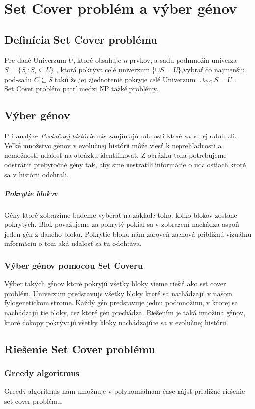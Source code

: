 \chapter{Set Cover problém a výber génov}
\section{Definícia Set Cover problému}
Pre dané Univerzum $U$, ktoré obsahuje $n$ prvkov, a sadu podmnožín univerza \(S=\{ S_i : S_i \subseteq U \}\)
, ktorá pokrýva celé univerzum \(\{\cup S = U\}\),vybrať čo najmenšiu pod-sadu \(C \subseteq S\) takú že jej zjednotenie pokryje celé Univerzum 
\(\cup_{S \epsilon C} S = U \) .\\ Set Cover problém patrí medzi NP tažké problémy.
\section{Výber génov}
Pri analýze \emph{Evolučnej histórie} nás zaujímajú udalosti ktoré sa v nej odohrali. Veľké množstvo génov v evolučnej histórii môže viesť k neprehľadnosti a nemožnosti udalosť na obrázku identifikovať.
Z obrázku teda potrebujeme odstrániť prebytočné gény tak, aby sme nestratili informácie o udalostiach ktoré sa v histórii odohrali.
\paragraph{Pokrytie blokov}
Gény ktoré zobrazíme budeme vyberať na základe toho, koľko blokov zostane pokrytých.
Blok považujeme za pokrytý pokiaľ sa v zobrazení nachádza aspoň jeden gén z daného bloku.
Pokrytie bloku nám zároveň zachová približnú vizuálnu informáciu o tom aká udalosť sa tu odohráva.
\subsection{Výber génov pomocou Set Coveru}
Výber takých génov ktoré pokryjú všetky bloky vieme riešiť ako set cover problém.
Univerzum predstavuje všetky bloky ktoré sa nachádzajú v našom fylogenetickom strome.
Každý gén predstavuje jednu podmnožinu, v ktorej sa nachádzajú tie bloky, cez ktoré gén prechádza.
Riešením je taká množina génov, ktoré dokopy pokrývajú všetky bloky nachádzajúce sa v evolučnej histórii.
\section{Riešenie Set Cover problému}
\subsection{Greedy algoritmus}
Greedy algoritmus nám umožnuje v polynomiálnom čase nájsť približné riešenie set cover problému.

